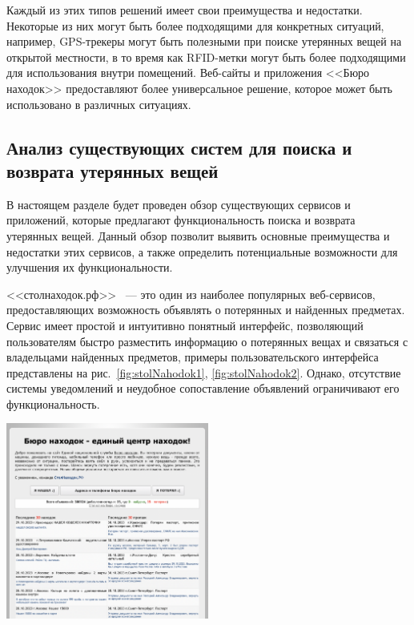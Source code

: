 \documentclass{mirea-article}
\newenvironment{Figure}
{\par\medskip\noindent\minipage{\linewidth}}
{\endminipage\par\medskip}
\begin{document}
	Каждый из этих типов решений имеет свои преимущества и недостатки. Некоторые из них могут быть более подходящими для конкретных ситуаций, например, GPS-трекеры могут быть полезными при поиске утерянных вещей на открытой местности, в то время как RFID-метки могут быть более подходящими для использования внутри помещений. Веб-сайты и приложения <<Бюро находок>> предоставляют более универсальное решение, которое может быть использовано в различных ситуациях.
	
	\subsection*{Анализ существующих систем для поиска и возврата утерянных вещей}
	
	В настоящем разделе будет проведен обзор существующих сервисов и приложений, которые предлагают функциональность поиска и возврата утерянных вещей. Данный обзор позволит выявить основные преимущества и недостатки этих сервисов, а также определить потенциальные возможности для улучшения их функциональности.
	
	<<столнаходок.рф>>~\cite{bib:stol_nahodok} --- это один из наиболее популярных веб-сервисов, предоставляющих возможность объявлять о потерянных и найденных предметах. Сервис имеет простой и интуитивно понятный интерфейс, позволяющий пользователям быстро разместить информацию о потерянных вещах и связаться с владельцами найденных предметов, примеры пользовательского интерфейса представлены на рис.~\ref{fig:stolNahodok1}, \ref{fig:stolNahodok2}. Однако, отсутствие системы уведомлений и неудобное сопоставление объявлений ограничивают его функциональность.
	
	\begin{Figure}
		\centering
		\includegraphics[width=0.5\textwidth]{../images/stolNahodok1}
		\label{fig:stolNahodok1}
	\end{Figure}
	
\end{document}
